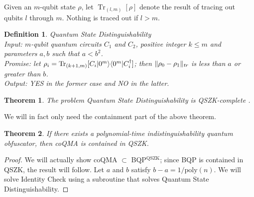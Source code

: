 \documentclass[11pt]{article}
\DeclareMathOperator{\tr}{Tr}
\numberwithin{equation}{section}
\newtheorem{theorem}{Theorem}
\newtheorem{definition}{Definition}
\begin{document}
{Given an $m$-qubit state $\rho$, let $\tr_{(l, m)}[\rho]$ denote the result of tracing out qubits $l$ through $m$. Nothing is traced out if $l > m$.

\begin{definition} \emph{Quantum State Distinguishability}\\
\indent Input: $m$-qubit quantum circuits $C_1$ and $C_2$, positive integer $k \leq m$ and parameters $a,b$ such that $a<b^2$.\\
\indent Promise: let $\rho_i = \tr_{(k+1, m)}[C_i\ket{0^m}\bra{0^m}C_i^\dagger]$; then $\|\rho_0 - \rho_1\|_\emph{tr}$ is less than $a$ or greater than $b$.\\
\indent Output: YES in the former case and NO in the latter.
\end{definition}

\begin{theorem}
The problem Quantum State Distinguishability is QSZK-complete \cite{Watrous02}.
\end{theorem}

We will in fact only need the containment part of the above theorem.

\begin{theorem}
If there exists a polynomial-time indistinguishability quantum obfuscator, then coQMA is contained in QSZK.
\end{theorem}
\begin{proof}
We will actually show coQMA $\subset$ BQP$^{\text{QSZK}}$; since BQP is contained in QSZK, the result will follow. Let $a$ and $b$ satisfy $b-a = 1 / \text{poly}(n)$. We will solve Identity Check using a subroutine that solves Quantum State Distinguishability. 


\end{proof}}
\end{document}
